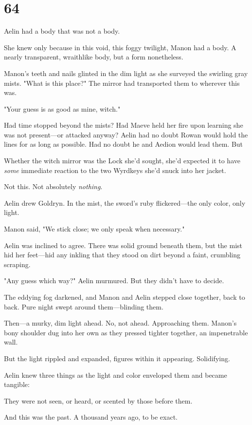 
\chapter{64}

Aelin had a body that was not a body.

She knew only because in this void, this foggy twilight, Manon had a body. A nearly transparent, wraithlike body, but  a form nonetheless.

Manon's teeth and nails glinted in the dim light as she surveyed the swirling gray mists. "What is this place?" The mirror had transported them to  wherever this was.

"Your guess is as good as mine, witch."

Had time stopped beyond the mists? Had Maeve held her fire upon learning she was not present---or attacked anyway? Aelin had no doubt Rowan would hold the lines for as long as possible. Had no doubt he and Aedion would lead them. But 

Whether the witch mirror was the Lock she'd sought, she'd expected it to have \emph{some} immediate reaction to the two Wyrdkeys she'd snuck into her jacket.

Not  this. Not absolutely \emph{nothing}.

Aelin drew Goldryn. In the mist, the sword's ruby flickered---the only color, only light.

Manon said, "We stick close; we only speak when necessary."

Aelin was inclined to agree. There was solid ground beneath them, but the mist hid her feet---hid any inkling that they stood on dirt beyond a faint, crumbling scraping.

"Any guess which way?" Aelin murmured. But they didn't have to decide.

The eddying fog darkened, and Manon and Aelin stepped close together, back to back. Pure night swept around them---blinding them.

Then---a murky, dim light ahead. No, not ahead. Approaching them. Manon's bony shoulder dug into her own as they pressed tighter together, an impenetrable wall.

But the light rippled and expanded, figures within it appearing. Solidifying.

Aelin knew three things as the light and color enveloped them and became tangible:

They were not seen, or heard, or scented by those before them.

And this was the past. A thousand years ago, to be exact.

